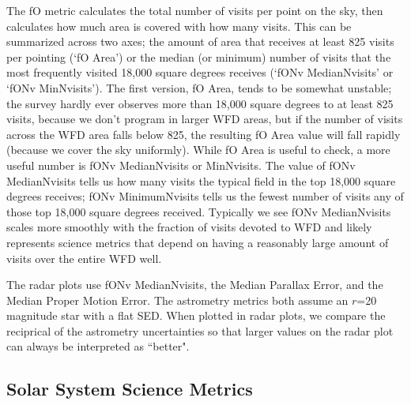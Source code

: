 The fO metric calculates the total number of visits per point on the sky, then calculates how much area is covered with how many visits. This can be summarized across two axes; the amount of area that receives at least 825 visits per pointing (`fO Area') or the median (or minimum) number of visits that the most frequently visited 18,000 square degrees receives (`fONv MedianNvisits' or `fONv MinNvisits'). The first version, fO Area, tends to be somewhat unstable; the survey hardly ever observes more than 18,000 square degrees to at least 825 visits, because we don't program in larger WFD areas, but if the number of visits across the WFD area falls below 825, the resulting fO Area value will fall rapidly (because we cover the sky uniformly). While fO Area is useful to check, a more useful number is fONv MedianNvisits or MinNvisits. The value of fONv MedianNvisits tells us how many visits the typical field in the top 18,000 square degrees receives; fONv MinimumNvisits tells us the fewest number of visits any of those top 18,000 square degrees received. Typically we see fONv MedianNvisits scales more smoothly with the fraction of visits devoted to WFD and likely represents science metrics that depend on having a reasonably large amount of visits over the entire WFD well. 

The radar plots use fONv MedianNvisits, the Median Parallax Error, and the Median Proper Motion Error. The astrometry metrics both assume an $r$=20 magnitude star with a flat SED. When plotted in radar plots, we compare the reciprical of the astrometry uncertainties so that larger values on the radar plot can always be interpreted as ``better".

\subsection{Solar System Science Metrics}

